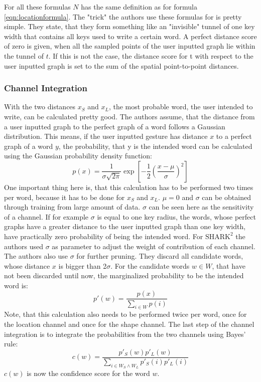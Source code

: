 For all these formulas $N$ has the same definition as for formula \ref{eqn:locationformula}. The "trick" the authors use these formulas for is pretty simple. They state, that they form something like an "invisible" tunnel of one key width that contains all keys used to write a certain word. A perfect distance score of zero is given, when all the sampled points of the user inputted graph lie within the tunnel of $t$. If this is not the case, the distance score for t with respect to the user inputted graph is set to the sum of the spatial point-to-point distances.

\subsubsection{Channel Integration}
With the two distances $x_S$ and $x_L$, the most probable word, the user intended to write, can be calculated pretty good. The authors assume, that the distance from a user inputted graph to the perfect graph of a word follows a Gaussian distribution. This means, if the user inputted gesture has distance $x$ to a perfect graph of a word $y$, the probability, that y is the intended word can be calculated using the Gaussian probability density function:
\begin{equation}
    p(x) = \frac{1}{\sigma\sqrt{2\pi}}\exp\left[{-\frac{1}{2}}\left(\frac{x-\mu}{\sigma}\right)^2\right]
    \label{eqn:gaussian}
\end{equation}
One important thing here is, that this calculation has to be performed two times per word, because it has to be done for $x_S$ and $x_L$. $\mu = 0$ and $\sigma$ can be obtained through training from large amount of data. $\sigma$ can be seen here as the sensitivity of a channel. If for example $\sigma$ is equal to one key radius, the words, whose perfect graphs have a greater distance to the user inputted graph than one key width, have practically zero probability of being the intended word. For $\text{SHARK}^2$ the authors used $\sigma$ as parameter to adjust the weight of contribution of each channel.\\
The authors also use $\sigma$ for further pruning. They discard all candidate words, whose distance $x$ is bigger than 2$\sigma$. For the candidate words $w \in W$, that have not been discarded until now, the marginalized probability to be the intended word is: 
\begin{equation}
    p'(w) = \frac{p(x)}{\sum\limits_{i \in W}p(i)}
\end{equation}
Note, that this calculation also needs to be performed twice per word, once for the location channel and once for the shape channel. The last step of the channel integration is to integrate the probabilities from the two channels using Bayes' rule:
\begin{equation}
    c(w) = \frac{p'_S(w)p'_L(w)}{\sum\limits_{i \in W_S \land W_L}p'_S(i)p'_L(i)}
\end{equation}
$c(w)$ is now the confidence score for the word $w$.

